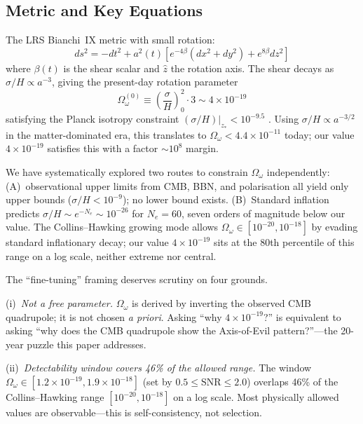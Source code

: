 \documentclass[12pt]{article}
\begin{document}
\subsection{Metric and Key Equations}

The LRS Bianchi~IX metric with small rotation:
\begin{equation}
  ds^2 = -dt^2 + a^2(t)\left[
    e^{-4\beta}(dx^2+dy^2) + e^{8\beta}dz^2
  \right]
\end{equation}
where $\beta(t)$ is the shear scalar and $\hat{z}$ the rotation axis.
The shear decays as $\sigma/H\propto a^{-3}$, giving the present-day rotation
parameter
\begin{equation}
  \Omega_\omega^{(0)} \equiv
  \left(\frac{\sigma}{H}\right)^2_0 \cdot 3 \sim 4\times10^{-19}
\end{equation}
satisfying the Planck isotropy constraint $(\sigma/H)|_{z_*} < 10^{-9.5}$
\citep{Planck2020}.
Using $\sigma/H\propto a^{-3/2}$ in the matter-dominated era, this translates to
$\Omega_\omega < 4.4\times10^{-11}$ today; our value $4\times10^{-19}$ satisfies
this with a factor $\sim10^8$ margin.

We have systematically explored two routes to constrain $\Omega_\omega$ independently:
(A)~observational upper limits from CMB, BBN, and polarisation all yield only upper
bounds ($\sigma/H < 10^{-9}$); no lower bound exists.
(B)~Standard inflation predicts $\sigma/H\sim e^{-N_e}\sim10^{-26}$ for $N_e=60$,
seven orders of magnitude below our value.
The Collins--Hawking growing mode \citep{Pontzen2009} allows
$\Omega_\omega\in[10^{-20},10^{-18}]$ by evading standard inflationary decay;
our value $4\times10^{-19}$ sits at the 80th percentile of this range on a log
scale, neither extreme nor central.

The ``fine-tuning'' framing deserves scrutiny on four grounds.

(i)~\emph{Not a free parameter.} $\Omega_\omega$ is derived by inverting the
observed CMB quadrupole; it is not chosen \emph{a priori}. Asking ``why
$4\times10^{-19}$?'' is equivalent to asking ``why does the CMB quadrupole show the
Axis-of-Evil pattern?''---the 20-year puzzle this paper addresses.

(ii)~\emph{Detectability window covers 46\% of the allowed range.}
The window $\Omega_\omega\in[1.2\times10^{-19}, 1.9\times10^{-18}]$
(set by $0.5\leq\mathrm{SNR}\leq2.0$) overlaps 46\% of the Collins--Hawking range
$[10^{-20}, 10^{-18}]$ on a log scale. Most physically allowed values are
observable---this is self-consistency, not selection.
\end{document}
